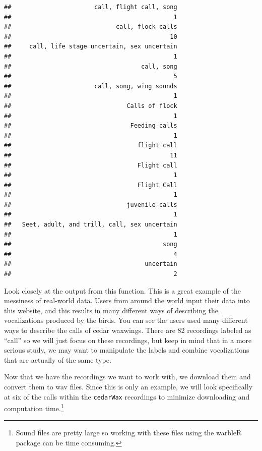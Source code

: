 \documentclass[
]{krantz}
\begin{document}
\begin{verbatim}
##                       call, flight call, song 
##                                             1 
##                             call, flock calls 
##                                            10 
##     call, life stage uncertain, sex uncertain 
##                                             1 
##                                    call, song 
##                                             5 
##                       call, song, wing sounds 
##                                             1 
##                                Calls of flock 
##                                             1 
##                                 Feeding calls 
##                                             1 
##                                   flight call 
##                                            11 
##                                   Flight call 
##                                             1 
##                                   Flight Call 
##                                             1 
##                                juvenile calls 
##                                             1 
##   Seet, adult, and trill, call, sex uncertain 
##                                             1 
##                                          song 
##                                             4 
##                                     uncertain 
##                                             2
\end{verbatim}

Look closely at the output from this function. This is a great example of the messiness of real-world data. Users from around the world input their data into this website, and this results in many different ways of describing the vocalizations produced by the birds. You can see the users used many different ways to describe the calls of cedar waxwings. There are 82 recordings labeled as ``call'' so we will just focus on these recordings, but keep in mind that in a more serious study, we may want to manipulate the labels and combine vocalizations that are actually of the same type.

Now that we have the recordings we want to work with, we download them and convert them to wav files. Since this is only an example, we will look specifically at six of the calls within the \texttt{cedarWax} recordings to minimize downloading and computation time.\footnote{Sound files are pretty large so working with these files using the warbleR package can be time consuming.}
\end{document}
